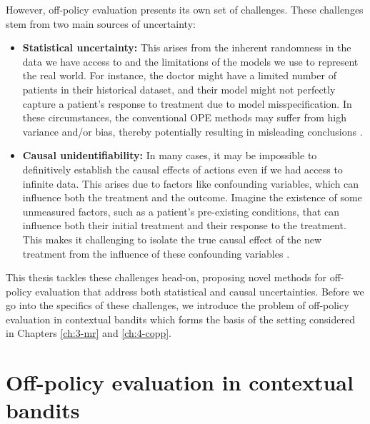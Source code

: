 However, off-policy evaluation presents its own set of challenges. These challenges stem from two main sources of uncertainty:

\begin{itemize}
    \item \textbf{Statistical uncertainty:} This arises from the inherent randomness in the data we have access to and the limitations of the models we use to represent the real world. 
    For instance, the doctor might have a limited number of patients in their historical dataset, and their model might not perfectly capture a patient's response to treatment due to model misspecification.
    In these circumstances, the conventional OPE methods may suffer from high variance and/or bias, thereby potentially resulting in misleading conclusions \citep{saito2021evaluating,su2020doubly,saito2022off}. 
    \item \textbf{Causal unidentifiability:} In many cases, it may be impossible to definitively establish the causal effects of actions even if we had access to infinite data. This arises due to factors like confounding variables, which can influence both the treatment and the outcome. Imagine the existence of some unmeasured factors, such as a patient's pre-existing conditions, that can influence both their initial treatment and their response to the treatment. This makes it challenging to isolate the true causal effect of the new treatment from the influence of these confounding variables \citep{tsiatis2019dynamic,kallus2018confounding,namkoong2020offpolicy}.
\end{itemize}
This thesis tackles these challenges head-on, proposing novel methods for off-policy evaluation that address both statistical and causal uncertainties.
Before we go into the specifics of these challenges, we introduce the problem of off-policy evaluation in contextual bandits which forms the basis of the setting considered in Chapters \ref{ch:3-mr} and \ref{ch:4-copp}. 


\section{Off-policy evaluation in contextual bandits}
